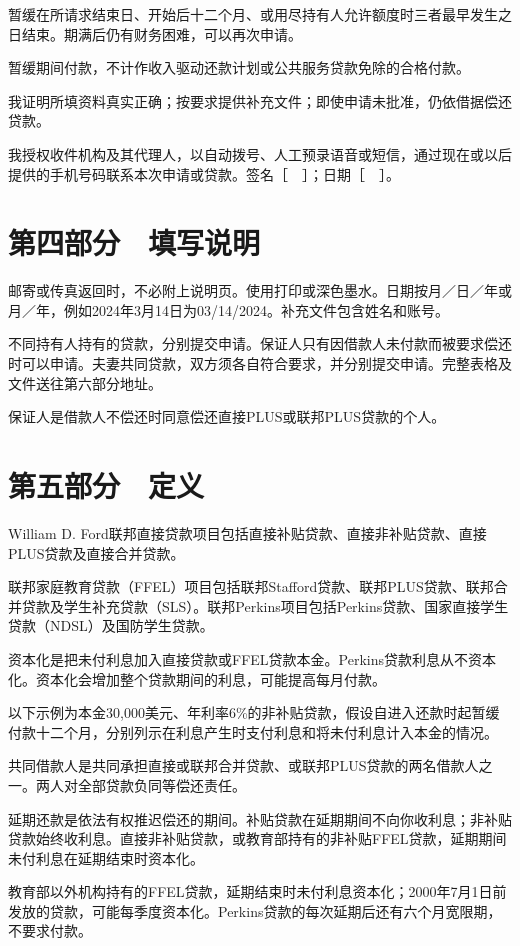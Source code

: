 \documentclass[UTF8,fontset=none,11pt,a4paper]{ctexart}
\begin{document}
暂缓在所请求结束日、开始后十二个月、或用尽持有人允许额度时三者最早发生之日结束。期满后仍有财务困难，可以再次申请。


暂缓期间付款，不计作收入驱动还款计划或公共服务贷款免除的合格付款。


我证明所填资料真实正确；按要求提供补充文件；即使申请未批准，仍依借据偿还贷款。


我授权收件机构及其代理人，以自动拨号、人工预录语音或短信，通过现在或以后提供的手机号码联系本次申请或贷款。签名［　］；日期［　］。


\section*{第四部分　填写说明}
邮寄或传真返回时，不必附上说明页。使用打印或深色墨水。日期按月／日／年或月／年，例如2024年3月14日为03/14/2024。补充文件包含姓名和账号。


不同持有人持有的贷款，分别提交申请。保证人只有因借款人未付款而被要求偿还时可以申请。夫妻共同贷款，双方须各自符合要求，并分别提交申请。完整表格及文件送往第六部分地址。


保证人是借款人不偿还时同意偿还直接PLUS或联邦PLUS贷款的个人。


\section*{第五部分　定义}
William D. Ford联邦直接贷款项目包括直接补贴贷款、直接非补贴贷款、直接PLUS贷款及直接合并贷款。


联邦家庭教育贷款（FFEL）项目包括联邦Stafford贷款、联邦PLUS贷款、联邦合并贷款及学生补充贷款（SLS）。联邦Perkins项目包括Perkins贷款、国家直接学生贷款（NDSL）及国防学生贷款。


资本化是把未付利息加入直接贷款或FFEL贷款本金。Perkins贷款利息从不资本化。资本化会增加整个贷款期间的利息，可能提高每月付款。


以下示例为本金30,000美元、年利率6\%的非补贴贷款，假设自进入还款时起暂缓付款十二个月，分别列示在利息产生时支付利息和将未付利息计入本金的情况。


共同借款人是共同承担直接或联邦合并贷款、或联邦PLUS贷款的两名借款人之一。两人对全部贷款负同等偿还责任。


延期还款是依法有权推迟偿还的期间。补贴贷款在延期期间不向你收利息；非补贴贷款始终收利息。直接非补贴贷款，或教育部持有的非补贴FFEL贷款，延期期间未付利息在延期结束时资本化。


教育部以外机构持有的FFEL贷款，延期结束时未付利息资本化；2000年7月1日前发放的贷款，可能每季度资本化。Perkins贷款的每次延期后还有六个月宽限期，不要求付款。
\end{document}
